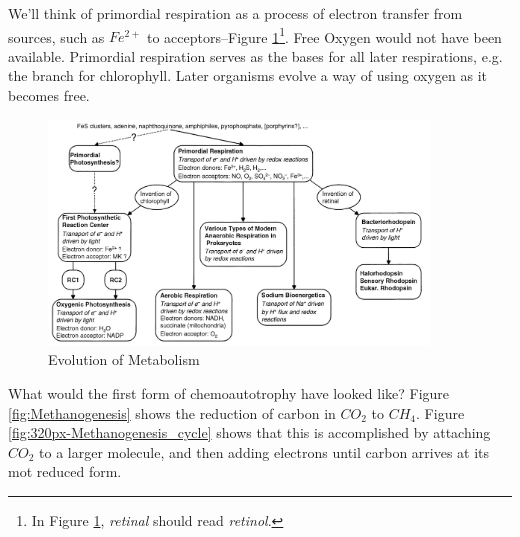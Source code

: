 \documentclass[]{article}
\begin{document}
We'll think of primordial respiration as a process of electron transfer from sources, such as $Fe^{2+}$ to acceptors--Figure \ref{fig:EvolutionMetabolism}\footnote{In Figure \ref{fig:EvolutionMetabolism}, \textit{retinal} should read \textit{retinol}.}. Free Oxygen would not have been available. Primordial respiration serves as the bases for all later respirations, e.g. the branch for chlorophyll. Later organisms evolve a way of using oxygen as it becomes free.
\begin{figure}[H]
	\caption{Evolution of Metabolism} \label{fig:EvolutionMetabolism} 
	\includegraphics[width=0.9\textwidth]{EvolutionMetabolism}
\end{figure}

What would the first form of chemoautotrophy have looked like? Figure \ref{fig:Methanogenesis} \cite{costa2014metabolic} shows the reduction of carbon in $CO_2$ to $CH_4$. Figure \ref{fig:320px-Methanogenesis_cycle} \cite{wiki:methanogenesis} shows that this is accomplished by attaching $CO_2$ to a larger molecule, and then adding electrons until carbon arrives at its mot reduced form. 
\end{document}
